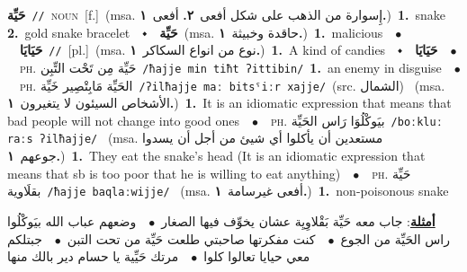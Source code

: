 \documentclass[10pt,a4paper,twoside]{article} %
\begin{document}
\begin{multicols}{2}
{\setlength\topsep{0pt}\textbf{\foreignlanguage{arabic}{حَيِّة}}\ {\color{gray}\texttt{//}\color{black}}\ \textsc{noun}\ [f.]\ \color{gray}(msa. \foreignlanguage{arabic}{إِسوارة من الذهب على شكل أفعى}~\foreignlanguage{arabic}{\textbf{٢.}}  \foreignlanguage{arabic}{أفعى}~\foreignlanguage{arabic}{\textbf{١.}})\color{black}\ \textbf{1.}~snake  \textbf{2.}~gold snake bracelet\ \ $\smblkdiamond$\ \ \setlength\topsep{0pt}\textbf{\foreignlanguage{arabic}{حَيِّة}}\ \color{gray}(msa. \foreignlanguage{arabic}{حاقدة وخبيثة}~\foreignlanguage{arabic}{\textbf{١.}})\color{black}\ \textbf{1.}~malicious\ \ $\bullet$\ \ \setlength\topsep{0pt}\textbf{\foreignlanguage{arabic}{حَيَايَا}}\ {\color{gray}\texttt{//}\color{black}}\ [pl.]\ \color{gray}(msa. \foreignlanguage{arabic}{نوع من انواع السكاكر}~\foreignlanguage{arabic}{\textbf{١.}})\color{black}\ \textbf{1.}~A kind of candies\ \ $\smblkdiamond$\ \ \setlength\topsep{0pt}\textbf{\foreignlanguage{arabic}{حَيَايَا}}\ \ $\bullet$\ \ \textsc{ph.} \color{gray} \foreignlanguage{arabic}{حَيِّة مِن تَحْت التِّبِن}\color{black}\ {\color{gray}\texttt{/{\sffamily ħajje min tiħt ʔittibin}/}\color{black}}\ \textbf{1.}~an enemy in disguise\ \ $\bullet$\ \ \textsc{ph.} \color{gray} \foreignlanguage{arabic}{الحَيِّة مَابِتْصِير خَيِّة}\color{black}\ {\color{gray}\texttt{/{\sffamily ʔilħajje maː bitsˤiːr xajje}/}\color{black}}\ \color{gray}(src. \foreignlanguage{arabic}{الشمال})\color{black}\ \color{gray} (msa. \foreignlanguage{arabic}{الأشخاص السيئون لا يتغيرون}~\foreignlanguage{arabic}{\textbf{١.}})\color{black}\ \textbf{1.}~It is an idiomatic expression that means that bad people will not change into good ones\ \ $\bullet$\ \ \textsc{ph.} \color{gray} \foreignlanguage{arabic}{بيَوكْلُوَا رَاس الحَيِّة}\color{black}\ {\color{gray}\texttt{/{\sffamily boːkluː raːs ʔilħajje}/}\color{black}}\ \color{gray} (msa. \foreignlanguage{arabic}{مستعدين أن يأكلوا أي شيئ من أجل أن يسدوا جوعهم}~\foreignlanguage{arabic}{\textbf{١.}})\color{black}\ \textbf{1.}~They eat the snake's head (It is an idiomatic expression that means that sb is too poor that he is willing to eat anything)\ \ $\bullet$\ \ \textsc{ph.} \color{gray} \foreignlanguage{arabic}{حَيِّة بقلَاوية}\color{black}\ {\color{gray}\texttt{/{\sffamily ħajje baqlaːwijje}/}\color{black}}\ \color{gray} (msa. \foreignlanguage{arabic}{أفعى غيرسامة}~\foreignlanguage{arabic}{\textbf{١.}})\color{black}\ \textbf{1.}~non-poisonous snake\  \begin{flushright}\color{gray}\foreignlanguage{arabic}{\textbf{\underline{\foreignlanguage{arabic}{أمثلة}}}: جاب معه حَيِّة بَقْلاوِيِة عشان يخوِّف فيها الصغار\ $\bullet$\ \  وضعهم عباب الله بيَوكْلُوا راس الحَيِّة من الجوع\ $\bullet$\ \  كنت مفكرتها صاحبتي طلعت حَيِّة من تحت التبن\ $\bullet$\ \  جبتلكم معي حيايا تعالوا كلوا\ $\bullet$\ \  مرتك حَيِّية يا حسام دير بالك منها}\end{flushright}\color{black}} \vspace{2mm}


\end{multicols}
\end{document}
